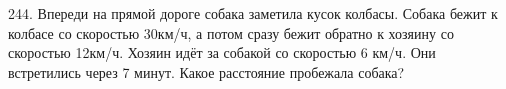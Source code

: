 244. Впереди на прямой дороге собака заметила кусок колбасы. Собака бежит к колбасе со скоростью 30км/ч, а потом сразу бежит обратно к хозяину со скоростью 12км/ч. Хозяин идёт за собакой со скоростью 6 км/ч. Они встретились через 7 минут. Какое расстояние пробежала собака?\\
